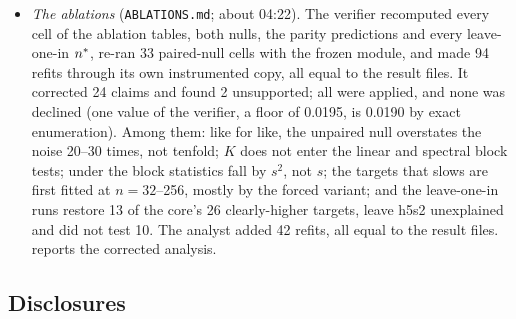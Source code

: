 \begin{itemize}
\item \emph{The ablations} (\texttt{ABLATIONS.md}; about 04:22). The verifier recomputed every cell of the ablation tables, both nulls, the parity predictions and every leave-one-in $n^{*}$, re-ran 33 paired-null cells with the frozen module, and made 94 refits through its own instrumented copy, all equal to the result files. It corrected 24 claims and found 2 unsupported; all were applied, and none was declined (one value of the verifier, a floor of 0.0195, is 0.0190 by exact enumeration). Among them: like for like, the unpaired null overstates the noise 20--30 times, not tenfold; $K$ does not enter the linear and spectral block tests; under  the block statistics fall by $s^2$, not $s$; the targets that  slows are first fitted at $n=32$--256, mostly by the forced variant; and the leave-one-in runs restore 13 of the core's 26 clearly-higher targets, leave h5s2 unexplained and did not test 10. The analyst added 42 refits, all equal to the result files.  reports the corrected analysis.
\end{itemize}

\subsection{Disclosures}\label{app:disclosures}

